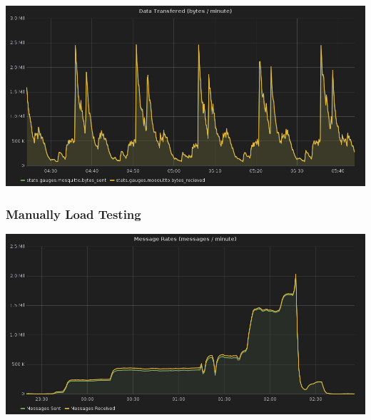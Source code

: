 \documentclass[aspectratio=169,11pt,hyperref={colorlinks=true}]{beamer}
\begin{document}
\begin{frame}
    \centering
    \includegraphics[width=.9\textwidth]{typical_data_rates.png}
\end{frame}

\begin{frame}
    \frametitle{Manually Load Testing}
    \centering
    \includegraphics[width=.9\textwidth]{manual-load-test.png}
\end{frame}
\end{document}
